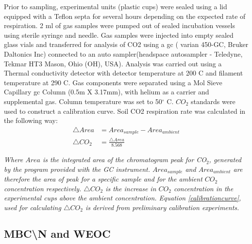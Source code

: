     	Prior to sampling, experimental units (plastic cups) were sealed using a lid equipped with a Teflon septa for several hours depending on the expected rate of respiration. 2 ml of gas samples were pumped out of sealed incubation vessels using sterile syringe and needle. Gas samples were injected into empty sealed glass vials and transferred for analysis of CO2 using a \gls{gc} ( varian 450-GC, Bruker Daltonics Inc) connected to an auto sampler(headspace autosampler - Teledyne, Tekmar HT3 Mason, Ohio (OH), USA). Analysis was carried out using a Thermal conductivity detector  with detector temperature at 200 C and filament temperature at 290 C. Gas components were separated using a Mol Sieve Capillary \gls{gc} Column (0.5m X 3.17mm), with helium as a carrier and supplemental gas. Column temperature was set to 50$ ^\circ $ C. $ CO_2 $  standards were used to construct a calibration curve.
    	Soil CO2 respiration rate was calculated in the following way:\\

   		\begin{align} %
   		\triangle Area &= Area_{sample} - Area_{ambient}\\
   		\triangle CO_2 &= \frac{\triangle Area}{8.568} \label{calibrationcurve}
   		\end{align}

    	\begin{adjustwidth}{50pt}{50pt}
    		\begin{footnotesize}
    			\textit{Where $Area$ is the integrated area of the chromatogram peak for CO$_2$, generated by the program provided with the GC instrument. $ Area_{sample} $ and $  Area_{ambient} $ are therefore the area of peak for a specific sample and for the ambient  $ CO_2 $ concentration respectively.  $\triangle CO_2$  is the increase in $ CO_2 $ concentration in the experimental cups above the ambient concentration. Equation \eqref{calibrationcurve}, used for calculating  $\triangle CO_2$ is derived from preliminary calibration experiments.}
    		\end{footnotesize}
		\end{adjustwidth}

    \subsection{MBC\textbackslash{}N and WEOC}

